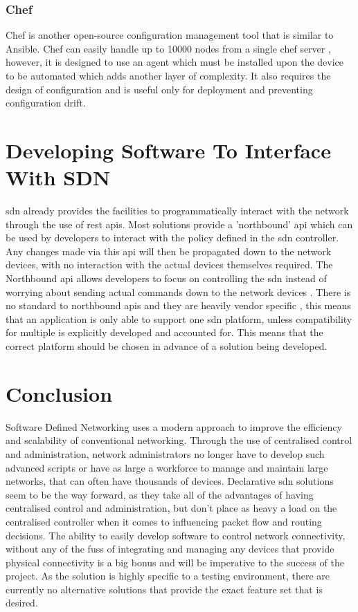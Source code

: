 \subsubsection{Chef}
Chef is another open-source configuration management tool that is similar to Ansible. Chef can easily handle up to 10000 nodes from a single chef server \citep{sabharwal2014automation}, however, it is designed to use an agent which must be installed upon the device to be automated which adds another layer of complexity. It also requires the design of configuration and is useful only for deployment and preventing configuration drift.

\section{Developing Software To Interface With SDN}
\label{litreview:developing}
\gls{sdn} already provides the facilities to programmatically interact with the network through the use of \gls{rest} \gls{api}s. Most solutions provide a 'northbound' \gls{api} which can be used by developers to interact with the policy defined in the \gls{sdn} controller. Any changes made via this \gls{api} will then be propagated down to the network devices, with no interaction with the actual devices themselves required. The Northbound \gls{api} allows developers to focus on controlling the \gls{sdn} instead of worrying about sending actual commands down to the network devices \citep{7899569}. There is no standard to northbound \gls{api}s and they are heavily vendor specific \citep{7502469}, this means that an application is only able to support one \gls{sdn} platform, unless compatibility for multiple is explicitly developed and accounted for. This means that the correct platform should be chosen in advance of a solution being developed.


\section{Conclusion}
Software Defined Networking uses a modern approach to improve the efficiency and scalability of conventional networking. Through the use of centralised control and administration, network administrators no longer have to develop such advanced scripts or have as large a workforce to manage and maintain large networks, that can often have thousands of devices. Declarative \gls{sdn} solutions seem to be the way forward, as they take all of the advantages of having centralised control and administration, but don't place as heavy a load on the centralised controller when it comes to influencing packet flow and routing decisions. The ability to easily develop software to control network connectivity, without any of the fuss of integrating and managing any devices that provide physical connectivity is a big bonus and will be imperative to the success of the project. As the solution is highly specific to a testing environment, there are currently no alternative solutions that provide the exact feature set that is desired.